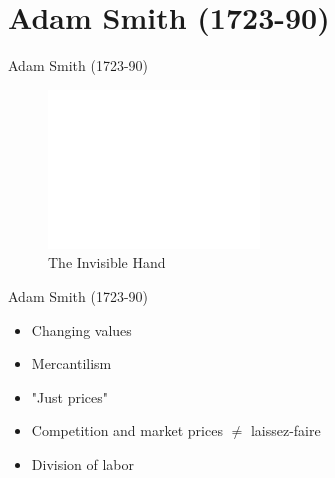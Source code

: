 \documentclass{beamer}
\begin{document}
\section{Adam Smith (1723-90)}

\begin{frame}{}

\end{frame}{}


\begin{frame}{Adam Smith (1723-90)}
    \begin{figure}
        \centering
        \includegraphics[width=0.5\textwidth, height=0.5\textheight]{../img/invisiblehand2.jpg}
        \caption{The Invisible Hand}
    \end{figure}
\end{frame}{}

\begin{frame}{Adam Smith (1723-90)}
    \begin{itemize}[<+- | alert@+>]
    \item Changing values 
    \item Mercantilism
    \item "Just prices"
    \item Competition and market prices $\neq$ laissez-faire
    \item Division of labor
    \end{itemize}
\end{frame}{}
\end{document}
